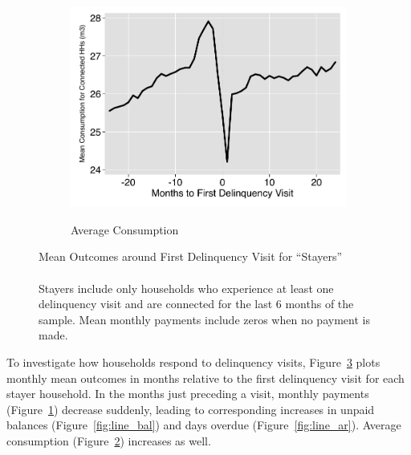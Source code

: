 \documentclass[12pt]{article}
\begin{document}
\begin{figure}[hbtp]
\begin{subfigure}[b]{0.49\textwidth}
        \label{fig:line_pay}
    \end{subfigure}
    \vskip 1mm \vskip 0pt
    \begin{subfigure}[b]{.49\textwidth}  
        \centering
        \caption[]{\small Average Consumption} 
        \vspace{-1mm}
        \includegraphics[width=\textwidth,trim={.2cm .2cm .2cm 0cm}, clip=true]{tables/line1_c}  
        \label{fig:line_c}
    \end{subfigure}
    \hfill \hspace{.02\textwidth}
    \begin{minipage}{0.47\textwidth}   
    \vspace{-6cm}
    \caption[]
    {\small Mean Outcomes around First Delinquency Visit for ``Stayers'' \\  \\  Stayers include only households who experience at least one delinquency visit and are connected for the last 6 months of the sample.  Mean monthly payments include zeros when no payment is made. } \label{fig:line_graphs}
    \end{minipage}
\end{figure} 


To investigate how households respond to delinquency visits, Figure~\ref{fig:line_graphs} plots monthly mean outcomes in months relative to the first delinquency visit for each stayer household.  In the months just preceding a visit, monthly payments (Figure~\ref{fig:line_pay}) decrease suddenly, leading to corresponding increases in unpaid balances (Figure~\ref{fig:line_bal}) and days overdue (Figure~\ref{fig:line_ar}).  Average consumption (Figure~\ref{fig:line_c}) increases as well.
\end{document}
